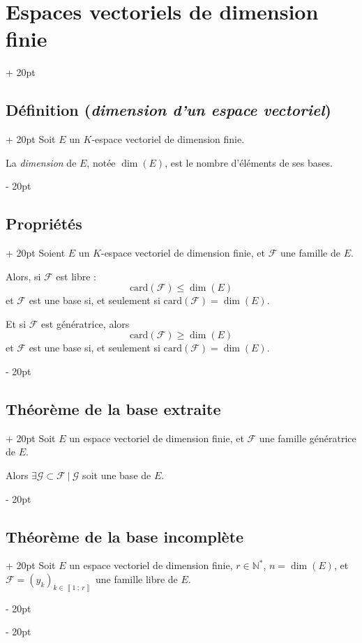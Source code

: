 \documentclass[a4paper, 12pt, twoside]{article}
\newcommand{\N}{\mathbb{N}} %
\newcommand{\nset}[2]{\left\llbracket #1\ ;\ #2 \right\rrbracket}
\renewcommand{\le}{\leqslant}
\renewcommand{\ge}{\geqslant}
\newcommand{\ind}[1][20pt]{\advance\leftskip + #1}
\newcommand{\deind}[1][20pt]{\advance\leftskip - #1}
\newenvironment{indt}[2][20pt]{#2 \par \ind[#1]}{\par \deind} %
\begin{document}
\begin{indt}{\section{Espaces vectoriels de dimension finie}}
        \begin{indt}{\subsection{Définition (\textit{dimension d'un espace vectoriel})}}
            Soit $E$ un $K$-espace vectoriel de dimension finie.
            
            La \textit{dimension} de $E$, notée $\dim(E)$, est le nombre d'éléments de ses bases.
        \end{indt}
        
        \vspace{12pt}
        
        \begin{indt}{\subsection{Propriétés}}
            Soient $E$ un $K$-espace vectoriel de dimension finie, et $\mathcal F$ une famille de $E$.
            
            Alors, si $\mathcal F$ est libre :
                \[ \mathrm{card}(\mathcal F) \le \dim(E) \]
            et $\mathcal F$ est une base si, et seulement si $\mathrm{card}(\mathcal F) = \dim(E)$.
            
            Et si $\mathcal F$ est génératrice, alors
                \[ \mathrm{card}(\mathcal F) \ge \dim(E) \]
            et $\mathcal F$ est une base si, et seulement si $\mathrm{card}(\mathcal F) = \dim(E)$.
        \end{indt}
        
        \begin{indt}{\subsection{Théorème de la base extraite}}
            Soit $E$ un espace vectoriel de dimension finie, et $\mathcal F$ une famille génératrice de $E$.
            
            Alors $\exists \mathcal G \subset \mathcal F\ |\ \mathcal G$ soit une base de $E$.
        \end{indt}
        
        \vspace{12pt}
        
        \begin{indt}{\subsection{Théorème de la base incomplète}}
            Soit $E$ un espace vectoriel de dimension finie, $r \in \N^*$, $n = \dim(E)$, et $\mathcal F = (y_k)_{k \in \nset 1 r}$ une famille libre de $E$.
            

\end{indt}
\end{indt}
\end{document}
